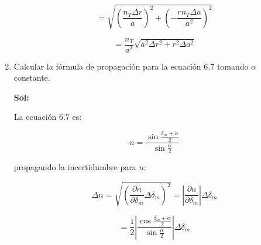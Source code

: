\documentclass[12pt,a4paper]{article}
\begin{document}
\begin{enumerate}
\begin{equation*}
    = \sqrt{\left(\frac{n_T\Delta r}{a}\right)^{2} + \left(-\frac{rn_T\Delta a}{a^2}\right)^{2}}
\end{equation*}

\begin{equation*}
    = \frac{n_T}{a^2}\sqrt{a^2\Delta r^{2}+r^2\Delta a^2}
\end{equation*}






\item Calcular la fórmula de propagación para la ecuación $6.7$ tomando $\alpha$ constante.

\textbf{Sol:}

La ecuación $6.7$ es:

\begin{equation*}
    n= \frac{\sin{\frac{\delta_m + \alpha}{2}}}{\sin{\frac{\alpha}{2}}}
\end{equation*}

propagando la incertidumbre para $n$:

\begin{equation*}
    \Delta n = \sqrt{\left(\frac{\partial n}{\partial\delta_m}\Delta \delta_m\right)^{2}} = \left|\frac{\partial n}{\partial \delta_m}\right|\Delta \delta_m
\end{equation*}

\begin{equation*}
    = \frac{1}{2}\left|\frac{\cos{\frac{\delta_m + \alpha}{2}}}{\sin{\frac{\alpha}{2}}} \right| \Delta \delta_m
\end{equation*}
    
\end{enumerate}
\end{document}
